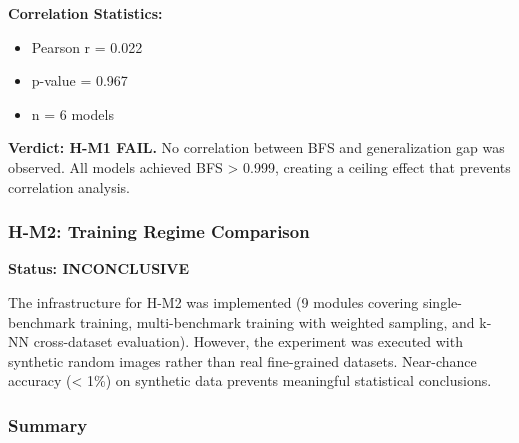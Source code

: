 \textbf{Correlation Statistics:}
\begin{itemize}
\item Pearson r = 0.022
\item p-value = 0.967
\item n = 6 models
\end{itemize}

\textbf{Verdict: H-M1 FAIL.} No correlation between BFS and generalization gap was observed. All models achieved BFS > 0.999, creating a ceiling effect that prevents correlation analysis.

\subsubsection{H-M2: Training Regime Comparison}

\textbf{Status: INCONCLUSIVE}

The infrastructure for H-M2 was implemented (9 modules covering single-benchmark training, multi-benchmark training with weighted sampling, and k-NN cross-dataset evaluation). However, the experiment was executed with synthetic random images rather than real fine-grained datasets. Near-chance accuracy (< 1\%) on synthetic data prevents meaningful statistical conclusions.

\subsubsection{Summary}

\begin{table}[htbp]
\centering
{}
\end{table}

